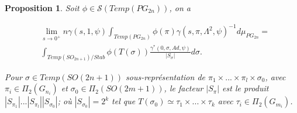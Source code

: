 \documentclass{amsart}
\newtheorem{proposition}{Proposition}[section]
\begin{document}
\begin{proposition}
\label{limitespectrale}
Soit $\phi \in \mathcal{S}(Temp(PG_{2n}))$, on a 

\begin{equation}
\begin{split}
& \lim_{s \rightarrow 0^+}  n \gamma(s, 1, \psi) \int_{Temp(PG_{2n})} \phi(\pi) \gamma(s, \pi, \Lambda^2, \psi)^{-1} d\mu_{PG_{2n}} = \\
& \int_{Temp(SO_{2n+1}) / Stab} \phi(T(\sigma)) \frac{\gamma^*(0, \sigma, Ad, \psi)}{|S_\sigma|} d\sigma.
 \end{split}
\end{equation}

Pour $\sigma \in Temp(SO(2n+1))$ sous-représentation de $\pi_1 \times ... \times \pi_l \times \sigma_0$, avec $\pi_i \in \Pi_{2}(G_{n_i})$ et $\sigma_0 \in \Pi_2(SO(2m+1))$, le facteur $|S_{\pi}|$ est le produit $|S_{\pi_1}|...|S_{\pi_l}||S_{\sigma_0}|$; où $|S_{\sigma_0}|=2^k$ tel que $T(\sigma_0) \simeq \tau_1 \times ... \times \tau_k$ avec $\tau_i \in \Pi_2(G_{m_i})$.
\end{proposition}
\end{document}
